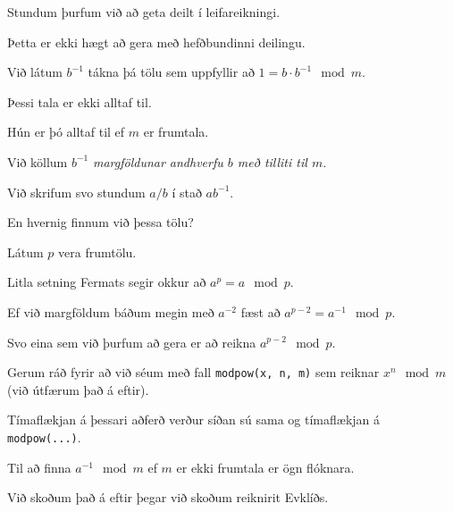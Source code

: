 {
	{
		\item<1-> Stundum þurfum við að geta deilt í leifareikningi.
		\item<2-> Þetta er ekki hægt að gera með hefðbundinni deilingu.
		\item<3-> Við látum $b^{-1}$ tákna þá tölu sem uppfyllir að $1 = b \cdot b^{-1} \mod m$.
		\item<4-> Þessi tala er ekki alltaf til.
		\item<5-> Hún er þó alltaf til ef $m$ er frumtala.
		\item<6-> Við köllum $b^{-1}$ \emph{margföldunar andhverfu $b$ með tilliti til $m$}.
		\item<7-> Við skrifum svo stundum $a/b$ í stað $ab^{-1}$.
		\item<8-> En hvernig finnum við þessa tölu?
	}
}

{
	{
		\item<1-> Látum $p$ vera frumtölu.
		\item<2-> Litla setning Fermats segir okkur að $a^p = a \mod p$.
		\item<3-> Ef við margföldum báðum megin með $a^{-2}$ fæst að $a^{p - 2} = a^{-1} \mod p$.
		\item<4-> Svo eina sem við þurfum að gera er að reikna $a^{p - 2} \mod p$.
		\item<5-> Gerum ráð fyrir að við séum með fall \texttt{modpow(x, n, m)} sem reiknar $x^n \mod m$ (við útfærum það á eftir).
		\item<6->[] 
		\item<7-> Tímaflækjan á þessari aðferð verður síðan sú sama og tímaflækjan á \texttt{modpow(...)}.
	}
}

{
	{
		\item<1-> Til að finna $a^{-1} \mod m$ ef $m$ er ekki frumtala er ögn flóknara.
		\item<2-> Við skoðum það á eftir þegar við skoðum reiknirit Evklíðs.
	}
}

{
}


